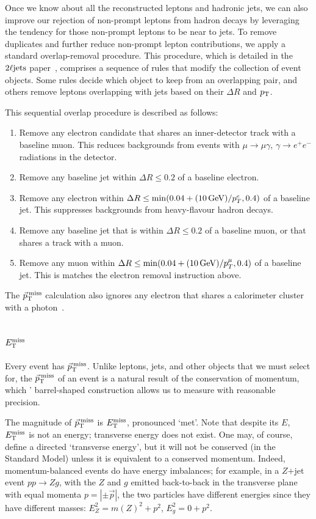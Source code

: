 Once we know about all the reconstructed leptons and hadronic jets, we can
also improve our rejection of non-prompt leptons from hadron decays by
leveraging the tendency for those non-prompt leptons to be near to jets.
To remove duplicates and further reduce non-prompt lepton contributions, we
apply a standard overlap-removal procedure.
This procedure, which is detailed in the $\twoljets$
paper~\cite{atlas2022searches},
comprises a sequence of rules that modify the collection of event objects.
Some rules decide which object to keep from an overlapping pair,
and others remove leptons overlapping with jets based on their $\Delta R$
and $\pt$.

This sequential overlap procedure is described as follows:
\begin{enumerate}
\item Remove any electron candidate that shares an inner-detector track with a
baseline muon.
This reduces backgrounds from events with
$\mu\to\mu\gamma$, $\gamma\to e^+ e^-$ radiations in the detector.
\item Remove any baseline jet within $\Delta R \leq 0.2$ of a baseline electron.
\item Remove any electron within
$\Delta R \leq \min(0.04 + (10\,\eV[G]) / p_T^e, 0.4)$
of a baseline jet.
This suppresses backgrounds from heavy-flavour hadron decays.
\item Remove any baseline jet that is within $\Delta R \leq 0.2$ of a baseline
muon, or that shares a track with a muon.
\item Remove any muon within
$\Delta R \leq \min(0.04 + (10\,\eV[G]) / p_T^\mu, 0.4)$
of a baseline jet.
This is matches the electron removal instruction above.
\end{enumerate}
The $\ptmiss$ calculation also ignores any electron that shares a calorimeter
cluster with a photon~\cite{atlas2022searches}.


\subsection{\texorpdfstring{$\met$}{ETmiss}}
Every event has $\ptmiss$.
Unlike leptons, jets, and other objects that we must select for, the $\ptmiss$
of an event is a natural result of the conservation of momentum, which \atlas'
barrel-shaped construction allows us to measure with reasonable precision.

The magnitude of $\ptmiss$ is $\met$, pronounced `met'.
Note that despite its $E$, $\met$ is not an energy; transverse energy does not exist.
One may, of course, define a directed `transverse energy', but it will
not be conserved (in the Standard Model) unless it is equivalent to a conserved
momentum.
Indeed, momentum-balanced events do have energy imbalances;
for example, in a $Z\mathrm{+jet}$ event $pp \to Zg$, with the $Z$ and
$g$ emitted back-to-back in the transverse plane with equal momenta
$p = |\pm \vec p|$, the two particles have different energies since they
have different masses: $E_Z^2 = m(Z)^2 + p^2$, $E_g^2 = 0 + p^2$.

